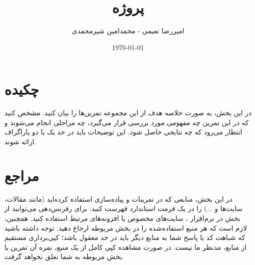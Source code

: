 \documentclass[a4paper,14pt]{extarticle}
\author{امیررضا نعیمی - محمدامین شیرمحمدی}
\date{\today}
\title{پروژه \assignNum}
\begin{document}
\maketitle
\newpage
\tableofcontents

\newpage
\listoffigures

\newpage
\listoftables

\newpage
{}

\section{چکیده}
در این بخش، به صورت خلاصه هدف از این مجموعه تمرین‌ها را بیان کنید. مشخص کنید که در این تمرین چه مفهومی مورد بررسی قرار می‌گیرد، چه مراحلی انجام می‌شوند و انتظار می‌رود که چه نتایجی حاصل شود. این توضیحات باید در حد یک یا دو پاراگراف ارائه شوند.

\section{مراجع}
در این بخش، منابعی که در تمرینات و پیاده‌سازی استفاده کرده‌اید (مانند مقالات، سایت‌ها و ...) را در یک فرمت استاندارد فهرست کنید. برای رفرنس‌دهی می‌توانید از بخش  در نرم‌افزار ، سایت‌های مخصوص یا افزونه‌های مرتبط استفاده کنید. همچنین، لازم است که هر منبع استفاده‌شده را در بخش مربوطه ارجاع دهید. توجه داشته باشید که شباهت کد یا پاسخ شما به منابع دیگر باید در حد معقول باشد؛ کپی‌برداری مستقیم از منابع، مدنظر ما نیست. در صورت مشاهده کپی کامل از یک منبع، نمره آن تمرین یا بخش مربوطه به شما تعلق نخواهد گرفت.
\end{document}
